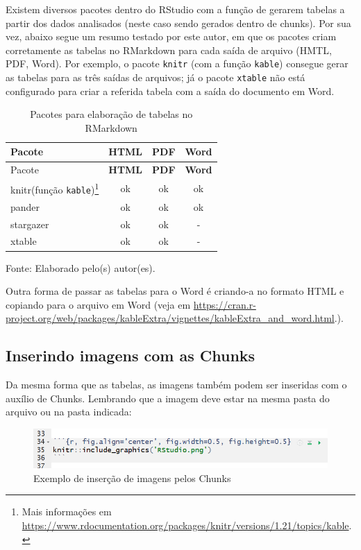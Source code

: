 \documentclass[12pt,brazil,oneside]{book}
\let\rmarkdownfootnote\footnote%
\def\footnote{\protect\rmarkdownfootnote}
\begin{document}
Existem diversos pacotes dentro do RStudio com a função de gerarem tabelas a partir dos dados analisados (neste caso sendo gerados dentro de chunks). Por sua vez, abaixo segue um resumo testado por este autor, em que os pacotes criam corretamente as tabelas no RMarkdown para cada saída de arquivo (HMTL, PDF, Word). Por exemplo, o pacote \texttt{knitr} (com a função \texttt{kable}) consegue gerar as tabelas para as três saídas de arquivos; já o pacote \texttt{xtable} não está configurado para criar a referida tabela com a saída do documento em Word.

\begin{longtable}[]{@{}lccc@{}}
\caption{\label{tab:tabelasrmk}Pacotes para elaboração de tabelas no RMarkdown}\tabularnewline
\toprule
Pacote & \textbf{HTML} & \textbf{PDF} & \textbf{Word}\tabularnewline
\midrule
\endfirsthead
\toprule
Pacote & \textbf{HTML} & \textbf{PDF} & \textbf{Word}\tabularnewline
\midrule
\endhead
knitr(função \texttt{kable})\footnote{Mais informações em \url{https://www.rdocumentation.org/packages/knitr/versions/1.21/topics/kable}. } & ok & ok & ok\tabularnewline
pander & ok & ok & ok\tabularnewline
stargazer & ok & ok & -\tabularnewline
xtable & ok & ok & -\tabularnewline
\bottomrule
\end{longtable}

Fonte: Elaborado pelo(s) autor(es).

Outra forma de passar as tabelas para o Word é criando-a no formato HTML e copiando para o arquivo em Word (veja em \url{https://cran.r-project.org/web/packages/kableExtra/vignettes/kableExtra_and_word.html}.).

\hypertarget{inserindo-imagens-com-as-chunks}{%
\subsection{Inserindo imagens com as Chunks}\label{inserindo-imagens-com-as-chunks}}

Da mesma forma que as tabelas, as imagens também podem ser inseridas com o auxílio de Chunks. Lembrando que a imagem deve estar na mesma pasta do arquivo ou na pasta indicada:

\begin{figure}[H]

{\centering \includegraphics[width=0.8\linewidth]{rmarkchunkimg} 

}

\caption{Exemplo de inserção de imagens pelos Chunks}\label{fig:rmarkchunk333}
\end{figure}
\end{document}
